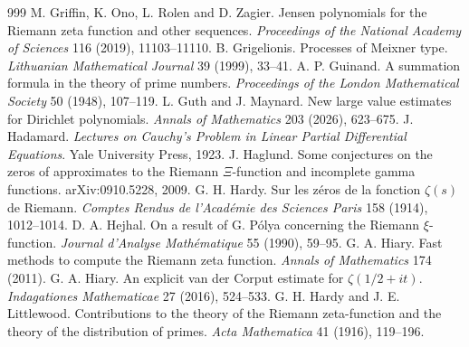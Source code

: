 \begin{thebibliography}{999}
 M. Griffin, K. Ono, L. Rolen and D. Zagier. Jensen polynomials for the Riemann zeta function and other sequences. \emph{Proceedings of the National Academy of Sciences} 116 (2019), 11103--11110.
 B. Grigelionis. Processes of Meixner type. \emph{Lithuanian Mathematical Journal} 39 (1999), 33--41.
 A. P. Guinand. A summation formula in the theory of prime numbers. \emph{Proceedings of the London Mathematical Society} 50 (1948), 107--119.
 L. Guth and J. Maynard. New large value estimates for Dirichlet polynomials. \emph{Annals of Mathematics} 203 (2026), 623--675.
 J. Hadamard. \emph{Lectures on Cauchy's Problem in Linear Partial Differential Equations}. Yale University Press, 1923.
 J. Haglund. Some conjectures on the zeros of approximates to the Riemann $\Xi$-function and incomplete gamma functions. arXiv:0910.5228, 2009.
 G. H. Hardy. Sur les z\'eros de la fonction $\zeta(s)$ de Riemann. \emph{Comptes Rendus de l'Acad\'emie des Sciences Paris} 158 (1914), 1012--1014.
 D. A. Hejhal. On a result of G. P\'olya concerning the Riemann $\xi$-function. \emph{Journal d'Analyse Math\'ematique} 55 (1990), 59--95.
 G. A. Hiary. Fast methods to compute the Riemann zeta function. \emph{Annals of Mathematics} 174 (2011).
 G. A. Hiary. An explicit van der Corput estimate for $\zeta(1/2+it)$. \emph{Indagationes Mathematicae} 27 (2016), 524--533.
 G. H. Hardy and J. E. Littlewood. Contributions to the theory of the Riemann zeta-function and the theory of the distribution of primes. \emph{Acta Mathematica} 41 (1916), 119--196.

\end{thebibliography}
